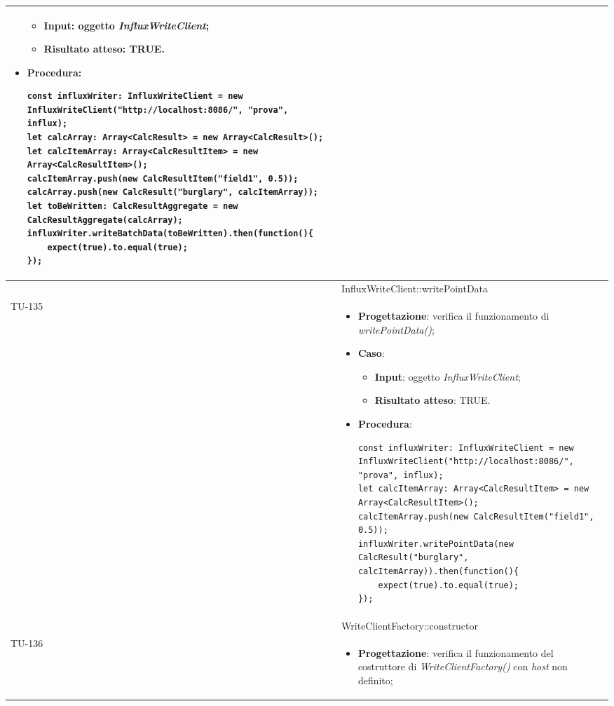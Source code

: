 \begin{longtable}{|C{1.5cm}|C{14.5cm}|}
\begin{itemize}
	\begin{itemize}
		\item \textbf{Input}: oggetto \emph{InfluxWriteClient};
		\item \textbf{Risultato atteso}: TRUE.
	\end{itemize}
	\item \textbf{Procedura}:
	\begin{lstlisting}
const influxWriter: InfluxWriteClient = new InfluxWriteClient("http://localhost:8086/", "prova", influx);
let calcArray: Array<CalcResult> = new Array<CalcResult>();
let calcItemArray: Array<CalcResultItem> = new Array<CalcResultItem>();
calcItemArray.push(new CalcResultItem("field1", 0.5));
calcArray.push(new CalcResult("burglary", calcItemArray)); 
let toBeWritten: CalcResultAggregate = new CalcResultAggregate(calcArray);
influxWriter.writeBatchData(toBeWritten).then(function(){
	expect(true).to.equal(true);
});
	\end{lstlisting}
\end{itemize}\\
\hline
{} & InfluxWriteClient::writePointData
\\ \hline
{TU-135} &
\begin{itemize}
	\item \textbf{Progettazione}: verifica il funzionamento di \emph{writePointData()};
	\item \textbf{Caso}: 
	\begin{itemize}
		\item \textbf{Input}: oggetto \emph{InfluxWriteClient};
		\item \textbf{Risultato atteso}: TRUE.
	\end{itemize}
	\item \textbf{Procedura}:
	\begin{lstlisting}
const influxWriter: InfluxWriteClient = new InfluxWriteClient("http://localhost:8086/", "prova", influx);
let calcItemArray: Array<CalcResultItem> = new Array<CalcResultItem>();
calcItemArray.push(new CalcResultItem("field1", 0.5));
influxWriter.writePointData(new CalcResult("burglary", calcItemArray)).then(function(){
	expect(true).to.equal(true);
});
	\end{lstlisting}
\end{itemize}\\
\hline
{} & WriteClientFactory::constructor
\\ \hline
{TU-136} &
\begin{itemize}
	\item \textbf{Progettazione}: verifica il funzionamento del costruttore di \emph{WriteClientFactory()} con \emph{host} non definito;

\end{itemize}
\end{longtable}
